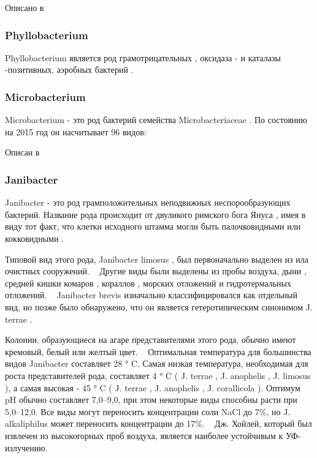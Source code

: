 \documentclass[11pt]{article}
\begin{document}
	Описано в ~\cite{Cohnella_1, Cohnella_2}
	
	\subsubsection{Phyllobacterium}
	Phyllobacterium является род грамотрицательных , оксидаза - и каталазы -позитивных, аэробных бактерий . ~\cite{Phyllobacterium_1, Phyllobacterium_2, Phyllobacterium_3, Phyllobacterium_4}
	
	\subsubsection{Microbacterium} 
	Microbacterium - это род бактерий семейства Microbacteriaceae . По состоянию на 2015 год он насчитывает 96 видов:  ~\cite{Microbacterium_2}
	
	Описан в ~\cite{Microbacterium_2, Microbacterium_3, Microbacterium_4}
	 
	\subsubsection{Janibacter}
	Janibacter - это род грамположительных неподвижных неспорообразующих бактерий. Название рода происходит от двуликого римского бога Януса , имея в виду тот факт, что клетки исходного штамма могли быть палочковидными или кокковидными .
	
	Типовой вид этого рода, Janibacter limosus , был первоначально выделен из ила очистных сооружений. ~\cite{Janibacter_2} Другие виды были выделены из пробы воздуха, дыни , средней кишки комаров , кораллов , морских отложений и гидротермальных отложений. ~\cite{Janibacter_3} Janibacter brevis изначально классифицировался как отдельный вид, но позже было обнаружено, что он является гетеротипическим синонимом J. terrae . ~\cite{Janibacter_4,Janibacter_5}
	
	Колонии, образующиеся на агаре представителями этого рода, обычно имеют кремовый, белый или желтый цвет. ~\cite{Janibacter_6,Janibacter_3} Оптимальная температура для большинства видов Janibacter составляет 28 ° C. Самая низкая температура, необходимая для роста представителей рода, составляет 4 ° C ( J. terrae , J. anophelis , J. limosus ), а самая высокая - 45 ° C ( J. terrae , J. anophelis , J. corallicola ). Оптимум pH обычно составляет 7,0–9,0, при этом некоторые виды способны расти при 5,0–12,0. Все виды могут переносить концентрации соли NaCl до 7\%, но J. alkaliphilus может переносить концентрации до 17\%.  ~\cite{Janibacter_3} Дж. Хойлей, который был извлечен из высокогорных проб воздуха, является наиболее устойчивым к УФ-излучению.  ~\cite{Janibacter_7}
	
\end{document}
